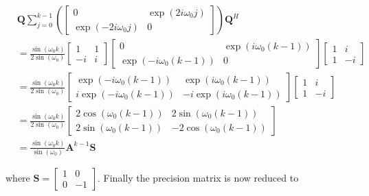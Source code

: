 \documentclass[11pt,a4paper,twoside]{report}
\newcommand{\mat}[1]{\mathbf{#1}}
\begin{document}
\begin{align}
	\nonumber
	& \mat{Q}\sum_{j=0}^{k-1}\left(
		\begin{bmatrix}
			0 & \exp{(2i\omega_0j)} \\
			\exp{(-2i\omega_0j)} & 0
		\end{bmatrix}
		\right)\mat{Q}^H
	\\
	\nonumber
	&= \frac{\sin{\left(\omega_0k\right)}}{2\sin{\left(\omega_0\right)}}
		\begin{bmatrix}
			1 & 1\\
			-i & i
		\end{bmatrix}
		\begin{bmatrix}
			0 & \exp{\left(i\omega_0\left(k-1\right)\right)} \\
			\exp{\left(-i\omega_0\left(k-1\right)\right)} & 0
		\end{bmatrix}
		\begin{bmatrix}
			1 & i \\
			1 & -i
		\end{bmatrix}
	\\
	\nonumber
	&= \frac{\sin{\left(\omega_0k\right)}}{2\sin{\left(\omega_0\right)}}
		\begin{bmatrix}
			\exp{\left(-i\omega_0\left(k-1\right)\right)} & \exp{\left(i\omega_0\left(k-1\right)\right)} \\
			i\exp{\left(-i\omega_0\left(k-1\right)\right)} & -i\exp{\left(i\omega_0\left(k-1\right)\right)}
		\end{bmatrix}
		\begin{bmatrix}
			1 & i \\
			1 & -i
		\end{bmatrix}
	\\
	\nonumber
	&= \frac{\sin{\left(\omega_0k\right)}}{2\sin{\left(\omega_0\right)}}
		\begin{bmatrix}
			2\cos{\left(\omega_0\left(k-1\right)\right)} & 2\sin{\left(\omega_0\left(k-1\right)\right)} \\
			2\sin{\left(\omega_0\left(k-1\right)\right)} & -2\cos{\left(\omega_0\left(k-1\right)\right)}
		\end{bmatrix}
	\\
	&= \frac{\sin{\left(\omega_0k\right)}}{\sin{\left(\omega_0\right)}}\mat{A}^{k-1}\mat{S}
\end{align}

where $\mat{S} = \begin{bmatrix} 1 & 0 \\
0 & -1 \end{bmatrix}$. Finally the precision matrix is now reduced to
\end{document}
